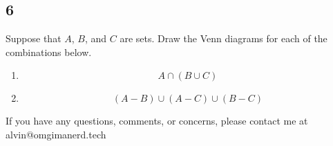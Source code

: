 \documentclass{math}
\begin{document}
\subsection*{6}
Suppose that \( A \), \( B \), and \( C \) are sets. Draw the Venn diagrams
for each of the combinations below.
\begin{enumerate}
  \item
  \[ A \cap (B \cup C) \]
  \begin{center}
    \def\firstcircle{(90:1.75cm) circle (2.5cm)}
    \def\secondcircle{(210:1.75cm) circle (2.5cm)}
    \def\thirdcircle{(330:1.75cm) circle (2.5cm)}
  \end{center}
  \item
  \[ (A-B) \cup (A-C) \cup (B-C) \]
  \begin{center}
    \def\firstcircle{(90:1.75cm) circle (2.5cm)}
    \def\secondcircle{(210:1.75cm) circle (2.5cm)}
    \def\thirdcircle{(330:1.75cm) circle (2.5cm)}
  \end{center}
\end{enumerate}

\begin{center}
  If you have any questions, comments, or concerns, please contact me at
  alvin@omgimanerd.tech
\end{center}
\end{document}
